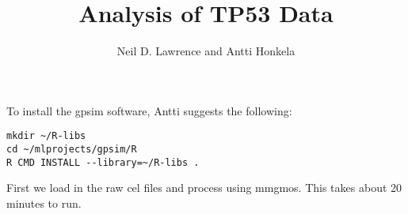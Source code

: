 \documentclass[a4paper]{article}
\title{Analysis of TP53 Data}
\author{Neil D. Lawrence and Antti Honkela}
\begin{document}
\maketitle

To install the gpsim software, Antti suggests the following:
\begin{verbatim}
mkdir ~/R-libs
cd ~/mlprojects/gpsim/R
R CMD INSTALL --library=~/R-libs .
\end{verbatim}

First we load in the raw cel files and process using mmgmos. This takes about 20 minutes to run. 
\end{document}
